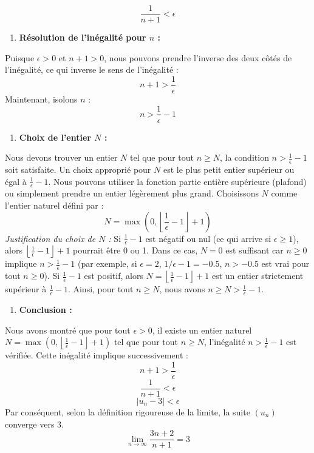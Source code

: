 \documentclass[a4paper,11pt]{report}
\begin{document}
    $$\frac{1}{n+1} < \epsilon$$
\begin{enumerate}
\item \textbf{Résolution de l'inégalité pour $n$ :}
\end{enumerate}
    Puisque $\epsilon > 0$ et $n+1 > 0$, nous pouvons prendre l'inverse des deux côtés de l'inégalité, ce qui inverse le sens de l'inégalité :
    $$n+1 > \frac{1}{\epsilon}$$
    Maintenant, isolons $n$ :
    $$n > \frac{1}{\epsilon} - 1$$
\begin{enumerate}
\item \textbf{Choix de l'entier $N$ :}
\end{enumerate}
    Nous devons trouver un entier $N$ tel que pour tout $n \ge N$, la condition $n > \frac{1}{\epsilon} - 1$ soit satisfaite.
    Un choix approprié pour $N$ est le plus petit entier supérieur ou égal à $\frac{1}{\epsilon} - 1$. Nous pouvons utiliser la fonction partie entière supérieure (plafond) ou simplement prendre un entier légèrement plus grand.
    Choisissons $N$ comme l'entier naturel défini par :
    $$N = \max\left(0, \left\lfloor \frac{1}{\epsilon} - 1 \right\rfloor + 1\right)$$
    \textit{Justification du choix de $N$ :}
    Si $\frac{1}{\epsilon} - 1$ est négatif ou nul (ce qui arrive si $\epsilon \ge 1$), alors $\left\lfloor \frac{1}{\epsilon} - 1 \right\rfloor + 1$ pourrait être 0 ou 1. Dans ce cas, $N=0$ est suffisant car $n \ge 0$ implique $n > \frac{1}{\epsilon} - 1$ (par exemple, si $\epsilon=2$, $1/\epsilon - 1 = -0.5$, $n > -0.5$ est vrai pour tout $n \ge 0$).
    Si $\frac{1}{\epsilon} - 1$ est positif, alors $N = \left\lfloor \frac{1}{\epsilon} - 1 \right\rfloor + 1$ est un entier strictement supérieur à $\frac{1}{\epsilon} - 1$.
    Ainsi, pour tout $n \ge N$, nous avons $n \ge N > \frac{1}{\epsilon} - 1$.
\begin{enumerate}
\item \textbf{Conclusion :}
\end{enumerate}
    Nous avons montré que pour tout $\epsilon > 0$, il existe un entier naturel $N = \max\left(0, \left\lfloor \frac{1}{\epsilon} - 1 \right\rfloor + 1\right)$ tel que pour tout $n \ge N$, l'inégalité $n > \frac{1}{\epsilon} - 1$ est vérifiée.
    Cette inégalité implique successivement :
    $$n+1 > \frac{1}{\epsilon}$$
    $$\frac{1}{n+1} < \epsilon$$
    $$|u_n - 3| < \epsilon$$
    Par conséquent, selon la définition rigoureuse de la limite, la suite $(u_n)$ converge vers 3.
    $$\lim_{n \to \infty} \frac{3n+2}{n+1} = 3$$

\vspace{1cm}
\end{document}
